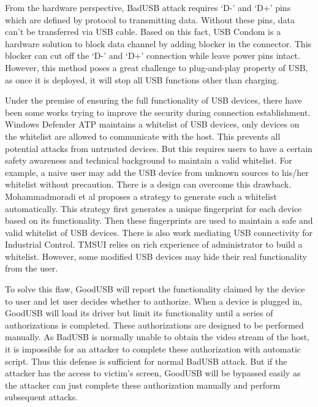 From the hardware perspective, BadUSB attack requires `D-' and `D+' pins which are defined by protocol to transmitting data.
Without these pins, data can't be transferred via USB cable. Based on this fact, USB Condom \cite{Condom} is a hardware solution to block data channel by adding blocker in the connector. This blocker can cut off the `D-' and `D+' connection while leave power pins intact.
However, this method poses a great challenge to plug-and-play property of USB, as once it is deployed, it will stop all USB functions other than charging. 

Under the premise of ensuring the full functionality of USB devices, there have been some works trying to improve the security during connection establishment.
Windows Defender ATP\cite{windenfenderwhite} maintains a whitelist of USB devices, only devices on the whitelist are allowed to communicate with the host. This prevents all potential attacks from untrusted devices. But this requires users to have a certain safety awareness and technical background to maintain a valid whitelist. For example, a naive user may add the USB device from unknown sources to his/her whitelist without precaution. There is a design can overcome this drawback. Mohammadmoradi et al\cite{mohammadmoradi2018making} proposes a strategy to generate such a whitelist automatically. This strategy first generates a unique fingerprint for each device based on its functionality. Then these fingerprints are used to maintain a safe and valid whitelist of USB devices. There is also work mediating USB connectivity for Industrial Control. TMSUI\cite{yang2015tmsui} relies on rich experience of administrator to build a whitelist. However, some modified USB devices may hide their real functionality from the user.

To solve this flaw, GoodUSB\cite{tian2015defending} will report the functionality claimed by the device to user and let user decides whether to authorize. When a device is plugged in, GoodUSB will load its driver but limit its functionality until a series of authorizations is completed. These authorizations are designed to be performed manually. As BadUSB is normally unable to obtain the video stream of the host, it is impossible for an attacker to complete these authorization with automatic script. Thus this defense is sufficient for normal BadUSB attack. But if the attacker has the access to victim's screen, GoodUSB will be bypassed easily as the attacker can just complete these authorization manually and perform subsequent attacks.

